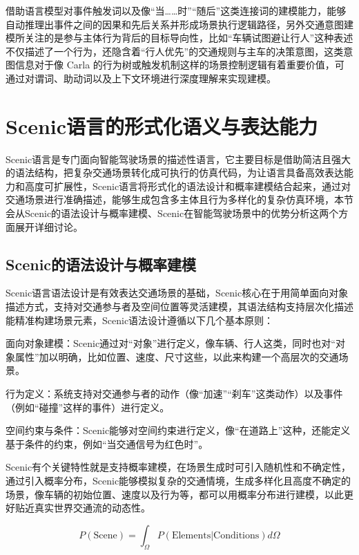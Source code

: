 借助语言模型对事件触发词以及像“当……时”“随后”这类连接词的建模能力，能够自动推理出事件之间的因果和先后关系并形成场景执行逻辑路径，另外交通意图建模所关注的是参与主体行为背后的目标导向性，比如“车辆试图避让行人”这种表述不仅描述了一个行为，还隐含着“行人优先”的交通规则与主车的决策意图，这类意图信息对于像 Carla 的行为树或触发机制这样的场景控制逻辑有着重要价值，可通过对谓词、助动词以及上下文环境进行深度理解来实现建模。


\section{Scenic语言的形式化语义与表达能力}

Scenic语言是专门面向智能驾驶场景的描述性语言，它主要目标是借助简洁且强大的语法结构，把复杂交通场景转化成可执行的仿真代码，为让语言具备高效表达能力和高度可扩展性，Scenic语言将形式化的语法设计和概率建模结合起来，通过对交通场景进行准确描述，能够生成包含多主体且行为多样化的复杂仿真环境，本节会从Scenic的语法设计与概率建模、Scenic在智能驾驶场景中的优势分析这两个方面展开详细讨论。

\subsection{Scenic的语法设计与概率建模}

Scenic语言语法设计是有效表达交通场景的基础，Scenic核心在于用简单面向对象描述方式，支持对交通参与者及空间位置等灵活建模，其语法结构支持层次化描述能精准构建场景元素，Scenic语法设计遵循以下几个基本原则：


面向对象建模：Scenic通过对“对象”进行定义，像车辆、行人这类，同时也对“对象属性”加以明确，比如位置、速度、尺寸这些，以此来构建一个高层次的交通场景。

行为定义：系统支持对交通参与者的动作（像“加速”“刹车”这类动作）以及事件（例如“碰撞”这样的事件）进行定义。

空间约束与条件：Scenic能够对空间约束进行定义，像“在道路上”这种，还能定义基于条件的约束，例如“当交通信号为红色时”。


Scenic有个关键特性就是支持概率建模，在场景生成时可引入随机性和不确定性，通过引入概率分布，Scenic能够模拟复杂的交通情境，生成多样化且高度不确定的场景，像车辆的初始位置、速度以及行为等，都可以用概率分布进行建模，以此更好贴近真实世界交通流的动态性。

\begin{equation}
	P(\text{Scene}) = \int_{\Omega} P(\text{Elements} | \text{Conditions}) d\Omega
\end{equation}

